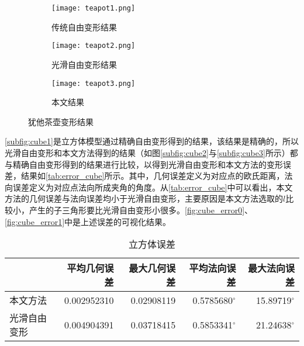\begin{figure}[htbp]
	\centering
	\begin{subfigure}[b]{.3\textwidth}
		\centering
		\texttt{[image: teapot1.png]}
		\caption{传统自由变形结果}\label{subfig:teapot1}
	\end{subfigure}
	\begin{subfigure}[b]{.3\textwidth}
		\centering
		\texttt{[image: teapot2.png]}
		\caption{光滑自由变形结果}\label{subfig:teapot2}
	\end{subfigure}
	\begin{subfigure}[b]{.3\textwidth}
		\centering
		\texttt{[image: teapot3.png]}
		\caption{本文结果}\label{subfig:teapot3}
	\end{subfigure}
	\caption{犹他茶壶变形结果}\label{fig:teapot_result}
\end{figure}

\autoref{subfig:cube1}是立方体模型通过精确自由变形得到的结果，该结果是精确的，所以光滑自由变形和本文方法得到的结果（如图\autoref{subfig:cube2}与\autoref{subfig:cube3}所示）都与精确自由变形得到的结果进行比较，以得到光滑自由变形和本文方法的变形误差，结果如\autoref{tab:error_cube}所示。其中，几何误差定义为对应点的欧氏距离，法向误差定义为对应点法向所成夹角的角度。从\autoref{tab:error_cube}中可以看出，本文方法的几何误差与法向误差均小于光滑自由变形，主要原因是本文方法选取的$l$比较小，产生的子三角形要比光滑自由变形小很多。\autoref{fig:cube_error0}、\autoref{fig:cube_error1}中是上述误差的可视化结果。

\begin{table}[htbp]
    \centering
    \begin{tabular}{lrrrr}
    \toprule
                    & 平均几何误差 & 最大几何误差 & 平均法向误差 & 最大法向误差 \\
    \midrule
        本文方法    & \num{0.002952310} & \num{0.02908119} & \num[scientific-notation=false]{0.5785680}$^\circ$ & \num[scientific-notation=false]{15.89719}$^\circ$ \\
        光滑自由变形& \num{0.004904391} & \num{0.03718415} & \num[scientific-notation=false]{0.5853341}$^\circ$ & \num[scientific-notation=false]{21.24638}$^\circ$ \\
    \bottomrule
    \end{tabular}
    \caption{立方体误差} \label{tab:error_cube}
\end{table}

